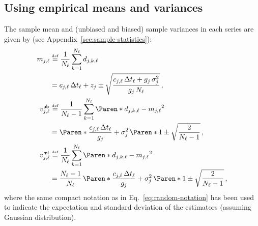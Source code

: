 \documentclass[a4paper,11pt,twoside]{scrartcl}
\newcommand*{\Tag}[1]{\mathsf{#1}}
\newcommand*{\bydef}{\stackrel{{\scriptscriptstyle \text{def}}}{=}}
\theoremstyle{plain} %
\theoremstyle{definition}
\theoremstyle{remark}
\begin{document}
\subsection{Using empirical means and variances}
\label{sec:using-sample-means-and-variances}

The sample mean and (unbiased and biased) sample variances in each series are
given by (see Appendix~\ref{sec:sample-statistics}):
\begin{align}
  m_{j,\ell}
  &\bydef \frac{1}{N_\ell} \sum_{k=1}^{N_\ell} d_{j,k,\ell} \notag\\
  &= c_{j,\ell}\,\Delta t_{\ell} + z_j
     \pm \sqrt{
       \frac{c_{j,\ell}\,\Delta t_{\ell} + g_j\,\sigma_j^2}{g_j\,N_{\ell}}
     } \, , \\
  v^\Tag{ub}_{j,\ell}
  &\bydef \frac{1}{N_\ell - 1} \sum_{k=1}^{N_{\ell}}
    \Paren*{d_{j,k,\ell} - m_{j,\ell}}^2 \notag\\
  &=  \Paren*{\frac{c_{j,\ell}\,\Delta t_{\ell}}{g_j} + \sigma_j^2} \,
     \Paren*{1 \pm \sqrt{\frac{2}{N_{\ell} - 1}}} \, , \\
  v^\Tag{ml}_{j,\ell}
  &\bydef \frac{1}{N_\ell} \sum_{k=1}^{N_{\ell}}
    \Paren*{d_{j,k,\ell} - m_{j,\ell}}^2 \notag\\
  &= \frac{N_\ell - 1}{N_\ell} \,\Paren*{\frac{c_{j,\ell}\,\Delta t_{\ell}}{g_j} + \sigma_j^2} \,
     \Paren*{1 \pm \sqrt{\frac{2}{N_{\ell} - 1}}} \, ,
\end{align}
where the same compact notation as in Eq.~\eqref{eq:random-notation} has been
used to indicate the expectation and standard deviation of the estimators
(assuming Gaussian distribution).
\end{document}
